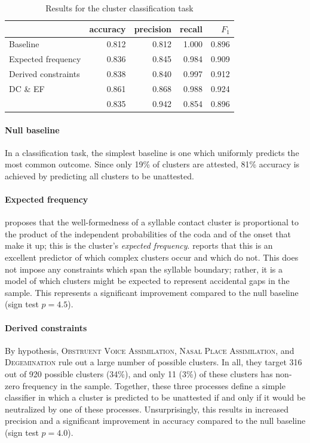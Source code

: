 \begin{table}
\centering
\begin{tabular}{l | rrrr}
\toprule
                    & accuracy & precision & recall & $F_1$ \\
\midrule
Baseline            & 0.812    & 0.812     & 1.000  & 0.896 \\
Expected frequency  & 0.836    & 0.845     & 0.984  & 0.909 \\
Derived constraints & 0.838    & 0.840     & 0.997  & 0.912 \\
DC \& EF            & 0.861    & 0.868     & 0.988  & 0.924 \\
\citet{Hayes2008a}  & 0.835    & 0.942     & 0.854  & 0.896 \\
\bottomrule
\end{tabular}
\caption{Results for the cluster classification task}
\label{cmresults}
\end{table}

\paragraph{Null baseline} 
In a classification task, the simplest baseline is one which uniformly predicts the most common outcome. 
Since only 19\% of clusters are attested, 
81\% accuracy is achieved by predicting all clusters to be unattested.

\paragraph{Expected frequency} 
\citet{Pierrehumbert1994} proposes that the well-formedness of a syllable contact cluster is proportional to the product of the independent probabilities of the coda and of the onset that make it up; this is the cluster's \emph{expected frequency}. 
\citeauthor{Pierrehumbert1994} reports that this is an excellent predictor of which complex clusters occur and which do not. 
This does not impose any constraints which span the syllable boundary; rather, it is a model of which clusters might be expected to represent accidental gaps in the sample.
This represents a significant improvement compared to the null baseline (sign test $p = 4.5$).

\paragraph{Derived constraints} 
By hypothesis, \textsc{Obstruent Voice Assimilation}, \textsc{Nasal Place Assimilation}, and \textsc{Degemination} rule out a large number of possible clusters. 
In all, they target 316 out of 920 possible clusters (34\%), and only 11 (3\%) of these clusters has non-zero frequency in the sample.
Together, these three processes define a simple classifier in which a cluster is predicted to be unattested if and only if it would be neutralized by one of these processes. 
Unsurprisingly, this results in increased precision and a significant improvement in accuracy compared to the null baseline (sign test $p = 4.0$). 

